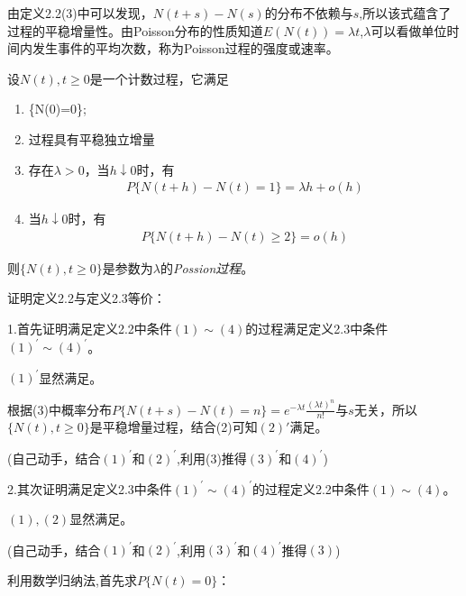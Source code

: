 由定义2.2(3)中可以发现，\(N(t+s)-N(s)\)的分布不依赖与\(s\),所以该式蕴含了过程的平稳增量性。由Poisson分布的性质知道\(E(N(t))=\lambda t\),\(\lambda\)可以看做单位时间内发生事件的平均次数，称为Poisson过程的强度或速率。

\begin{definition}\label{def:Pois-Proc2}
	设\(N(t),t\geqslant 0\)是一个计数过程，它满足
	\begin{enumerate}
		\item \{N(0)=0\};
		\item 过程具有平稳独立增量
		\item 存在\(\lambda>0\)，当\(h\downarrow 0\)时，有
		      \begin{align*}
			      P\{N(t+h)-N(t)=1\}=\lambda h+o(h)
		      \end{align*}
		\item 当\(h\downarrow 0\)时，有
		      \begin{align*}
			      P\{N(t+h)-N(t)\geqslant 2\}=o(h)
		      \end{align*}
	\end{enumerate}
	则\(\{N(t),t\geqslant 0\}\)是参数为\(\lambda\)的\emph{Possion过程}。
\end{definition}

\newpage

证明定义2.2与定义2.3等价：

1.首先证明满足定义2.2中条件\((1)\sim (4)\)的过程满足定义2.3中条件\((1)^{\prime}\sim (4)^{\prime}\)。

\((1)^{\prime}\)显然满足。

根据(3)中概率分布\(P\{N(t+s)-N(t)=n\}=e^{-\lambda t}\frac{(\lambda t)^n}{n!}\)与\(s\)无关，所以\(\{N(t),t\geqslant 0\}\)是平稳增量过程，结合(2)可知\((2)'\)满足。

(自己动手，结合\((1)^{\prime}\)和\((2)^{\prime}\),利用(3)推得\((3)^{\prime}\)和\((4)^{\prime}\))

\vspace{15em}

2.其次证明满足定义2.3中条件\((1)^{\prime}\sim (4)^{\prime}\)的过程定义2.2中条件\((1)\sim (4)\)。

\((1),(2)\)显然满足。

(自己动手，结合\((1)^{\prime}\)和\((2)^{\prime}\),利用\((3)^{\prime}\)和\((4)^{\prime}\)推得\((3)\))

利用数学归纳法,首先求\(P\{N(t)=0\}\)：

\newpage

